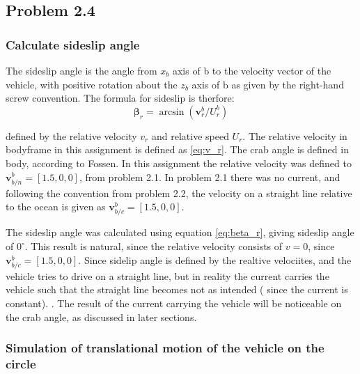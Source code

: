 
\subsection*{Problem 2.4}

\subsubsection*{Calculate sideslip angle}

The sideslip angle is the angle from $x_b$ axis of {b} to the velocity vector of the vehicle, with positive rotation about the $z_b$ axis of {b} as given by the right-hand screw convention. The formula for sideslip is therfore:
\begin{equation}
    \boldsymbol{\beta}_r = \arcsin( \mathbf{v}^b_r/U^b_r)
    \label{eq:beta_r}
\end{equation}

defined by the relative velocity $v_r$ and relative speed $U_r$. The relative velocity in bodyframe in this assignment is defined as \eqref{eq:v_r}. The crab angle is defined in body, according to Fossen. In this assignment the relative velocity was defined to $\mathbf{v}^b_{b/n} = [1.5, 0,0]$, from problem 2.1. In problem 2.1 there was no current, and following the convention from problem 2.2, the velocity on a straight line relative to the ocean is given as $\mathbf{v}^b_{b/c} = [1.5, 0,0]$.  

The sideslip angle was calculated using equation \eqref{eq:beta_r}, giving sideslip angle of $0 ^\circ$. This result is natural, since the relative velocity consists of $v=0$, since  $\mathbf{v}^b_{b/c} = [1.5, 0,0]$. Since sidelip angle is defined by the realtive velociites, and the vehicle tries to drive on a straight line, but in reality the current carries the vehicle such that the straight line becomes not as intended ( since the current is constant). . The result of the current carrying the vehicle will be noticeable on the crab angle, as discussed in later sections. 

\subsubsection{Simulation of translational motion of the vehicle on the circle}

